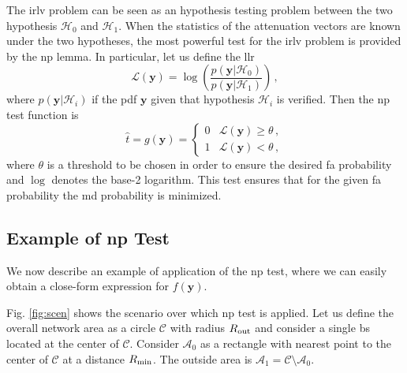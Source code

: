 \documentclass[conference,final]{IEEEtran}
\begin{document}
The \ac{irlv} problem can be seen as an hypothesis testing problem between the two hypothesis $\mathcal H_0$ and $\mathcal H_1$. When the statistics of the attenuation vectors are known under the two hypotheses, the most powerful test for the \ac{irlv} problem is provided by the \ac{np} lemma. In particular, let us  define the \ac{llr}
\begin{equation}\label{eq:lr}
    \mathcal{L}{(\bm{y})}=\log\left(\frac{p(\bm{y}|\mathcal{H}_0)}{p(\bm{y}|\mathcal{H}_1)}\right)\,,
\end{equation}
where $p(\bm{y}|\mathcal{H}_i)$ if the \ac{pdf} $\bm{y}$ given that hypothesis $\mathcal H_i$ is verified. Then the \ac{np} test function is 
\begin{equation}
\label{eq:thrOpt}
    \hat{t} = g(\bm{y}) = \begin{cases}
    0 & \mathcal{L}{(\bm{y})} \geq \theta\,, \\ 
    1 & \mathcal{L}{(\bm{y})} < \theta\,, 
    \end{cases}
\end{equation}
where $\theta$ is a threshold to be chosen in order to ensure the desired \ac{fa} probability and $\log$ denotes the base-2 logarithm. This test ensures that for the given \ac{fa} probability the \ac{md} probability is minimized. 

\subsection{Example of \ac{np} Test}
\label{sec:los}
We now describe an example of application of the \ac{np} test, where we can easily obtain a close-form expression for $f(\bm{y})$. 

Fig. \ref{fig:scen} shows the scenario over which \ac{np} test is applied. Let us define the overall network area as a circle $\mathcal{C}$ with radius $R_{\rm out}$ and consider a single \ac{bs} located at the center of $\mathcal{C}$. Consider $\mathcal{A}_{0}$ as a rectangle with nearest point to the center of $\mathcal{C}$ at a distance $R_{\rm min}$. The outside area is $\mathcal{A}_1 = \mathcal{C} \setminus \mathcal{A}_0$.
\end{document}

